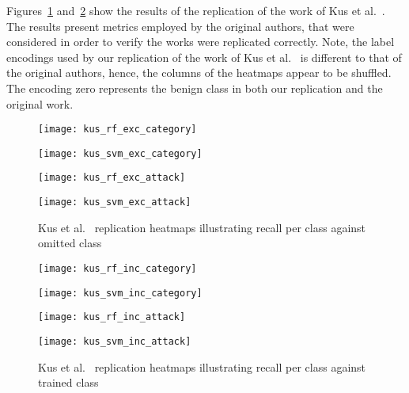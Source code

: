 %
Figures~\ref{fig:kus_rep_exc} and~\ref{fig:kus_rep_inc} show the results of the
replication of the work of Kus et al.~\cite{Kus}. The results present metrics
employed by the original authors, that were considered in order to verify the
works were replicated correctly. Note, the label encodings used by our
replication of the work of Kus et al.~\cite{Kus} is different to that of the
original authors, hence, the columns of the heatmaps appear to be shuffled. The
encoding zero represents the benign class in both our replication and the
original work.
%
\begin{figure}[htbp]
    \centering
    \begin{minipage}[h]{0.5\textwidth}
        \centering
        \texttt{[image: kus\_rf\_exc\_category]}
    \end{minipage}\hfill
    \begin{minipage}[h]{0.5\textwidth}
        \centering
        \texttt{[image: kus\_svm\_exc\_category]}
    \end{minipage}
    \begin{minipage}[h]{0.5\textwidth}
        \centering
        \texttt{[image: kus\_rf\_exc\_attack]}
    \end{minipage}\hfill
    \begin{minipage}[h]{0.5\textwidth}
        \centering
        \texttt{[image: kus\_svm\_exc\_attack]}
    \end{minipage}
    \caption[Kus et al.~\cite{Kus} Replication Class Omission Heatmaps]{Kus et al.~\cite{Kus} replication heatmaps illustrating recall per class against omitted class\label{fig:kus_rep_exc}}
\end{figure}

\begin{figure}[htbp]
    \centering
    \begin{minipage}[h]{0.5\textwidth}
        \centering
        \texttt{[image: kus\_rf\_inc\_category]}
    \end{minipage}\hfill
    \begin{minipage}[h]{0.5\textwidth}
        \centering
        \texttt{[image: kus\_svm\_inc\_category]}
    \end{minipage}
    \begin{minipage}[h]{0.5\textwidth}
        \centering
        \texttt{[image: kus\_rf\_inc\_attack]}
    \end{minipage}\hfill
    \begin{minipage}[h]{0.5\textwidth}
        \centering
        \texttt{[image: kus\_svm\_inc\_attack]}
    \end{minipage}
    \caption[Kus et al.~\cite{Kus} Replication Single Class Heatmaps]{Kus et al.~\cite{Kus} replication heatmaps illustrating recall per class against trained class\label{fig:kus_rep_inc}}
\end{figure}
% 


